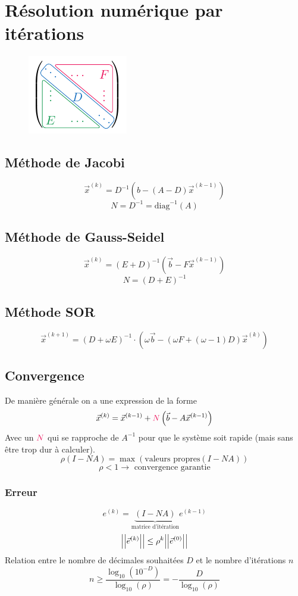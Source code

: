\documentclass[resume]{subfiles}
\begin{document}
\section{Résolution numérique par itérations}
\begin{figure}[H]
\centering
\includegraphics[scale=1,page=1]{drwg_2.pdf}
\end{figure}
\subsection{Méthode de Jacobi}
$$\vec{x}^{(k)}=D^{-1}\left(b-(A-D)\vec{x}^{(k-1)}\right)$$
$$N=D^{-1}=\text{diag}^{-1}(A)$$
\subsection{Méthode de Gauss-Seidel}
$$\vec{x}^{(k)}=(E+D)^{-1}\left(\vec{b}-F\vec{x}^{(k-1)}\right)$$
$$N=(D+E)^{-1}$$
\subsection{Méthode SOR}
$$\vec{x}^{(k+1)}=(D+\omega E)^{-1}\cdot \left(\omega \vec{b}-(\omega F+(\omega-1)D)\vec{x}^{(k)}\right)$$
\subsection{Convergence}
De manière générale on a une expression de la forme
$$\vec{x}^{(k)}=\vec{x}^{(k-1)}+\textcolor{OrangeRed}{N}\left(\vec{b}-A\vec{x}^{(k-1)}\right)$$
Avec un $\textcolor{OrangeRed}{N}$ qui se rapproche de $A^{-1}$ pour que le système soit rapide (mais sans être trop dur à calculer).\\
$$\boxed{\rho(I-NA)=\max\left(\text{valeurs propres}(I-NA)\right)}$$
$$\rho < 1\longrightarrow\text{ convergence garantie}$$
\subsubsection{Erreur}
$$e^{(k)}=\underbrace{(I-NA)}_\text{matrice d'itération}e^{(k-1)}$$
$$\abs{\abs{\vec{e}^{(k)}}}\leq \rho^{k}\abs{\abs{\vec{e}^{(0)}}}$$
Relation entre le nombre de décimales souhaitées $D$ et le nombre d'itérations $n$
$$n\geq \frac{\log_{10}(10^{-D})}{\log_{10}(\rho)}=-\frac{D}{\log_{10}(\rho)}$$
\end{document}
